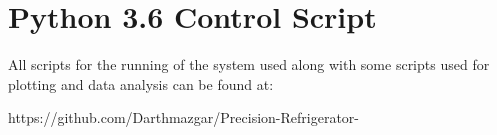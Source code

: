 \documentclass[10pt]{article}
\begin{document}
\section{Python 3.6 Control Script}
All scripts for the running of the system used along with some scripts used for plotting and data analysis can be found at:

\centering https://github.com/Darthmazgar/Precision-Refrigerator-


 
 
% 
\end{document}
